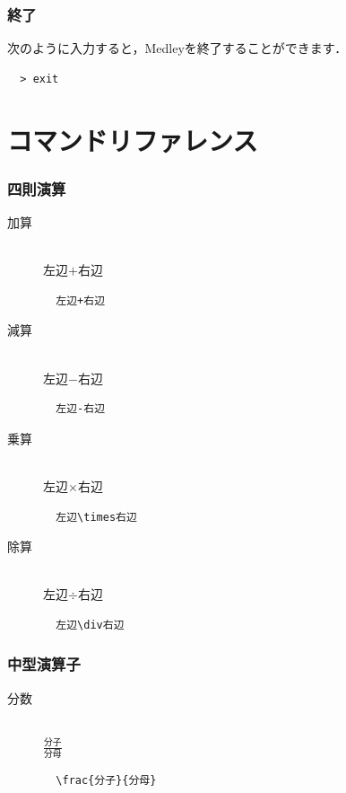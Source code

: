 \documentclass{ltjsarticle}
\begin{document}
    \section{終了}
    次のように入力すると，Medleyを終了することができます．
    \begin{lstlisting}
  > exit
    \end{lstlisting}

    \newpage


    \part{コマンドリファレンス}
    \label{part:command}


    \section{四則演算}
    \begin{description}
        \item [加算]\mbox{}\\
        左辺$+$右辺
        \begin{lstlisting}
  左辺+右辺
        \end{lstlisting}
        \item [減算]\mbox{}\\
        左辺$-$右辺
        \begin{lstlisting}
  左辺-右辺
        \end{lstlisting}
        \item [乗算]\mbox{}\\
        左辺$\times$右辺
        \begin{lstlisting}
  左辺\times右辺
        \end{lstlisting}
        \item [除算]\mbox{}\\
        左辺$\div$右辺
        \begin{lstlisting}
  左辺\div右辺
        \end{lstlisting}
    \end{description}


    \section{中型演算子}
    \begin{description}
        \item [分数]\mbox{}\\
        $\frac{分子}{分母}$\vspace{5pt}
        \begin{lstlisting}
  \frac{分子}{分母}
        \end{lstlisting}
    \end{description}
\end{document}
